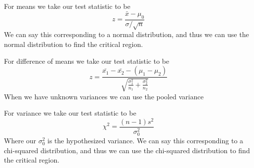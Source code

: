 \documentclass[answers,12pt,addpoints]{exam}
\begin{document}
\begin{definition}
    For means we take our test statistic to be 
    $$ z = \frac{\bar{x} - \mu_0}{\sigma/\sqrt{n}}$$
    We can say this corresponding to a normal distribution, and thus we can use the normal distribution to find the critical region.
\end{definition}
\begin{definition}
    For difference of means we take our test statistic to be 
    $$ z = \frac{\bar{x_1} - \bar{x_2} -(\mu_1 - \mu_2)}{\sqrt{\frac{\sigma_1^2}{n_1} + \frac{\sigma_2^2}{n_2}}}$$
    When we have unknown variances we can use the pooled variance
\end{definition}
\begin{definition}
    For variance we take our test statistic to be 
    $$ \chi^2 = \frac{(n-1)s^2}{\sigma_0^2}$$
    Where our $\sigma_0^2$ is the hypothesized variance.
    We can say this corresponding to a chi-squared distribution, and thus we can use the chi-squared distribution to find the critical region.
\end{definition}
\end{document}
